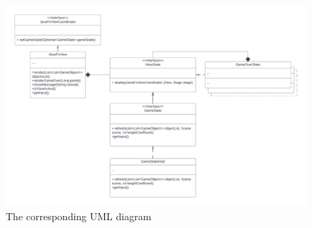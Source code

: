 \documentclass[a4paper,12pt]{report}
\begin{document}
\begin{figure}[H]
	\centering
	\includegraphics[width=\textwidth]{res/ViewState.pdf}
	\caption{The corresponding UML diagram}
\end{figure}
\pagebreak
\end{document}
